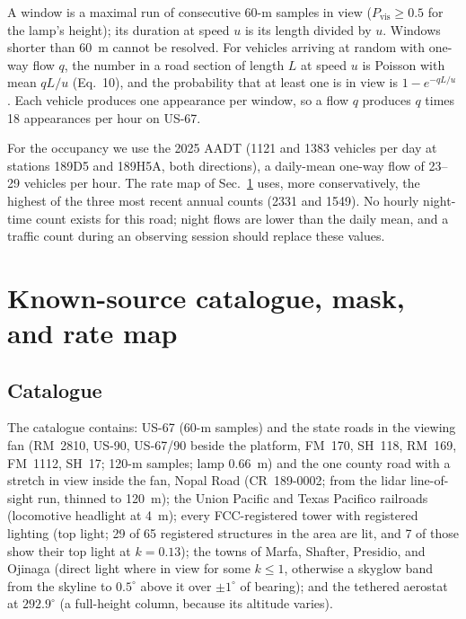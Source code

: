 \documentclass[11pt]{article}
\begin{document}
A window is a maximal run of consecutive 60-m samples in view ($P_{\mathrm{vis}}\ge0.5$ for the lamp's height); its duration at speed $u$ is its length divided by $u$. Windows shorter than 60~m cannot be resolved. For vehicles arriving at random with one-way flow $q$, the number in a road section of length $L$ at speed $u$ is Poisson with mean $qL/u$ (Eq.~10), and the probability that at least one is in view is $1-e^{-qL/u}$. Each vehicle produces one appearance per window, so a flow $q$ produces $q$ times 18 appearances per hour on US-67.

For the occupancy we use the 2025 AADT (1121 and 1383 vehicles per day at stations 189D5 and 189H5A, both directions), a daily-mean one-way flow of 23--29 vehicles per hour. The rate map of Sec.~\ref{s:mask} uses, more conservatively, the highest of the three most recent annual counts (2331 and 1549). No hourly night-time count exists for this road; night flows are lower than the daily mean, and a traffic count during an observing session should replace these values.

\section{Known-source catalogue, mask, and rate map}\label{s:mask}

\subsection{Catalogue}

The catalogue contains: US-67 (60-m samples) and the state roads in the viewing fan (RM~2810, US-90, US-67/90 beside the platform, FM~170, SH~118, RM~169, FM~1112, SH~17; 120-m samples; lamp 0.66~m) and the one county road with a stretch in view inside the fan, Nopal Road (CR~189-0002; from the lidar line-of-sight run, thinned to 120~m); the Union Pacific and Texas Pacifico railroads (locomotive headlight at 4~m); every FCC-registered tower with registered lighting (top light; 29 of 65 registered structures in the area are lit, and 7 of those show their top light at $k=0.13$); the towns of Marfa, Shafter, Presidio, and Ojinaga (direct light where in view for some $k\le1$, otherwise a skyglow band from the skyline to $0.5^\circ$ above it over $\pm1^\circ$ of bearing); and the tethered aerostat at $292.9^\circ$ (a full-height column, because its altitude varies).
\end{document}
